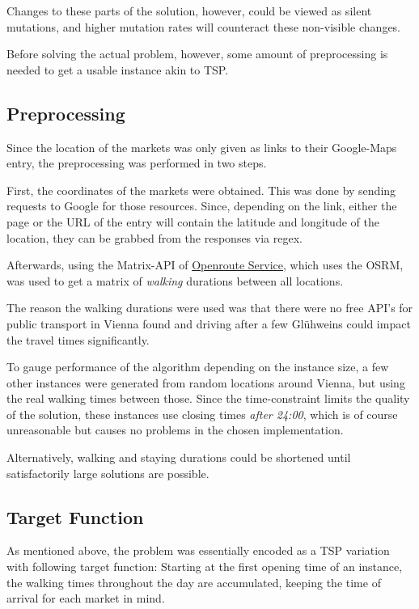 \documentclass[10pt]{scrartcl}
\begin{document}
Changes to these parts of the solution, however, could be viewed as silent mutations, and higher mutation rates will counteract these non-visible changes.

Before solving the actual problem, however, some amount of preprocessing is needed to get a usable instance akin to TSP.

\subsection{Preprocessing}

Since the location of the markets was only given as links to their Google-Maps entry, the preprocessing was performed in two steps.

First, the coordinates of the markets were obtained.
This was done by sending requests to Google for those resources.
Since, depending on the link, either the page or the URL of the entry will contain the latitude and longitude of the location, they can be grabbed from the responses via regex.

Afterwards, using the Matrix-API of \href{https://openrouteservice.org/}{Openroute Service}, which uses the OSRM, was used to get a matrix of \emph{walking} durations between all locations.

The reason the walking durations were used was that there were no free API's for public transport in Vienna found and driving after a few Glühweins could impact the travel times significantly.

To gauge performance of the algorithm depending on the instance size, a few other instances were generated from random locations around Vienna, but using the real walking times between those.
Since the time-constraint limits the quality of the solution, these instances use closing times \emph{after 24:00}, which is of course unreasonable but causes no problems in the chosen implementation.

Alternatively, walking and staying durations could be shortened until satisfactorily large solutions are possible.

\subsection{Target Function}

As mentioned above, the problem was essentially encoded as a TSP variation with following target function:
Starting at the first opening time of an instance, the walking times throughout the day are accumulated, keeping the time of arrival for each market in mind.
\end{document}
